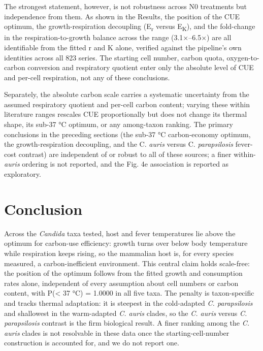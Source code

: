 \documentclass[
]{article}
\begin{document}
The strongest statement, however, is not robustness across N0 treatments
but independence from them. As shown in the Results, the position of the
CUE optimum, the growth-respiration decoupling (E\textsubscript{r}
versus E\textsubscript{K}), and the fold-change in the
respiration-to-growth balance across the range (3.1×--6.5×) are all
identifiable from the fitted r and K alone, verified against the
pipeline's own identities across all 823 series. The starting cell
number, carbon quota, oxygen-to-carbon conversion and respiratory
quotient enter only the absolute level of CUE and per-cell respiration,
not any of these conclusions.

Separately, the absolute carbon scale carries a systematic uncertainty
from the assumed respiratory quotient and per-cell carbon content;
varying these within literature ranges rescales CUE proportionally but
does not change its thermal shape, its sub-37 °C optimum, or any
among-taxon ranking. The primary conclusions in the preceding sections
(the sub-37 °C carbon-economy optimum, the growth-respiration
decoupling, and the C. \emph{auris} versus C. \emph{parapsilosis}
fever-cost contrast) are independent of or robust to all of these
sources; a finer within-\emph{auris} ordering is not reported, and the
Fig. 4e association is reported as exploratory.

\section{\texorpdfstring{\textbf{Conclusion}}{Conclusion}}\label{conclusion}

Across the \emph{Candida} taxa tested, host and fever temperatures lie
above the optimum for carbon-use efficiency: growth turns over below
body temperature while respiration keeps rising, so the mammalian host
is, for every species measured, a carbon-inefficient environment. This
central claim holds scale-free: the position of the optimum follows from
the fitted growth and consumption rates alone, independent of every
assumption about cell numbers or carbon content, with P(\textless{} 37
°C) = 1.0000 in all five taxa. The penalty is taxon-specific and tracks
thermal adaptation: it is steepest in the cold-adapted \emph{C.
parapsilosis} and shallowest in the warm-adapted \emph{C. auris} clades,
so the \emph{C. auris} versus \emph{C. parapsilosis} contrast is the
firm biological result. A finer ranking among the \emph{C. auris} clades
is not resolvable in these data once the starting-cell-number
construction is accounted for, and we do not report one.
\end{document}
